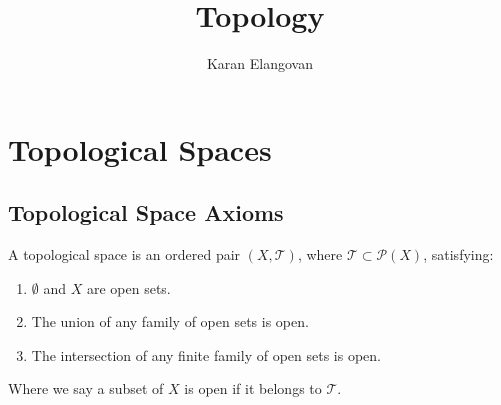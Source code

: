 \documentclass[]{article}
\title{Topology}
\author{Karan Elangovan}
\begin{document}
\maketitle

\doublespacing
\tableofcontents

\section{Topological Spaces}

\subsection{Topological Space Axioms}

\begin{defi} 
		A topological space is an ordered pair $(X, \mathcal{T})$, where $\mathcal{T} \subset \mathcal{P}(X)$, satisfying:
		\begin{enumerate}
				\item  $\emptyset$ and $X$ are open sets.
				\item The union of any family of open sets is open.
				\item The intersection of any finite family of open sets is open.
		\end{enumerate}

		Where we say a subset of $X$ is open if it belongs to $\mathcal{T}$.
\end{defi} 
\end{document}
